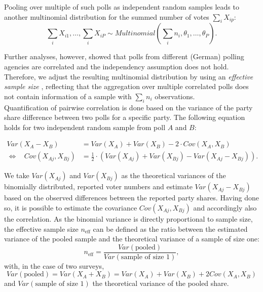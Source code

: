 \documentclass[smallcondensed]{svjour3}     %
\begin{document}
Pooling over multiple of such polls as independent random samples leads to another
multinomial distribution for the summed number of votes $\sum_i X_{ip}$:
\begin{equation}
\sum\limits_i X_{i1},\ldots, \sum\limits_i X_{iP}
  \sim Multinomial \left( \sum\limits_i n_i,\theta_1,\ldots,\theta_P\right).
\end{equation}

Further analyses, however, showed that polls from different (German) polling agencies are correlated
and the independency assumption does not hold. Therefore, we adjust the resulting multinomial
distribution by using an \textit{effective sample size} \citep{hanley_2003}, reflecting that the aggregation over multiple correlated polls does not contain information of a sample with $\sum_i n_i$ observations.\\

Quantification of pairwise correlation is done based on the variance of the party share difference between two polls for a specific party. The following equation holds for two independent
random sample from poll $A$ and $B$:

\begin{equation}
\begin{aligned}
Var(X_A - X_B) &= Var(X_A) + Var(X_B) - 2 \cdot Cov(X_A, X_B) \\
\Leftrightarrow \ \ \ \ Cov(X_{Aj}, X_{Bj}) &= \frac{1}{2} \cdot \left(Var(X_{Aj}) + Var(X_{Bj}) - Var(X_{Aj} - X_{Bj}) \right).
\end{aligned}
\end{equation}

We take $Var(X_{Aj})$ and $Var(X_{Bj})$ as the theoretical variances of the binomially distributed, reported voter numbers and estimate $Var(X_{Aj} - X_{Bj})$ based on the observed differences between the reported party shares. Having done so, it is possible to estimate the covariance $Cov(X_{Aj}, X_{Bj})$ and accordingly also the correlation. As the binomial variance is directly proportional to sample size, the effective sample size $n_{\text{eff}}$ can be defined as the ratio between the estimated variance of the pooled sample and the theoretical variance of a sample of size one:
$$
n_{\text{eff}} = \frac{Var(\text{pooled})}{Var(\text{sample of size 1})},
$$
with, in the case of two surveys,
$$
Var(\text{pooled}) = Var(X_A + X_B) = Var(X_A) + Var(X_B) + 2 Cov(X_A,X_B)
$$
and $Var(\text{sample of size 1})$ the theoretical variance of the pooled share.
\end{document}
